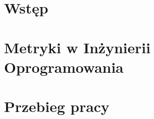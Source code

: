 \chapter*{Wstęp}
\thispagestyle{empty}




\chapter{Metryki w Inżynierii Oprogramowania}
\setcounter{page}{1}




\chapter{Przebieg pracy}


